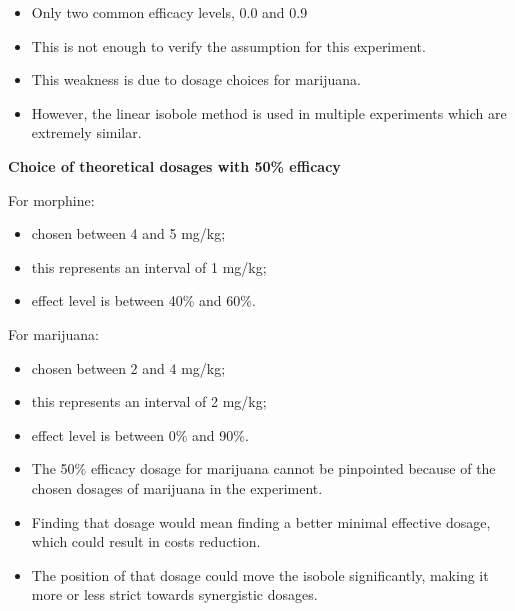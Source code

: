 \documentclass[14pt]{beamer}
\begin{document}
\begin{frame}
\begin{itemize}[label={$\blacktriangleright$}]
\item Only two common efficacy levels, 0.0 and 0.9
\item This is not enough to verify the assumption for this experiment.
\item This weakness is due to dosage choices for marijuana.
\item However, the linear isobole method is used in multiple experiments which are extremely similar.
\end{itemize}
\end{frame}

\begin{frame}
\textbf{Choice of theoretical dosages with 50\% efficacy}

For morphine:
\begin{itemize}[label={$\blacktriangleright$}]
\item chosen between 4 and 5 mg/kg;
\item this represents an interval of 1 mg/kg;
\item effect level is between 40\% and 60\%.
\end{itemize}
For marijuana:
\begin{itemize}[label={$\blacktriangleright$}]
\item chosen between 2 and 4 mg/kg;
\item this represents an interval of 2 mg/kg;
\item effect level is between 0\% and 90\%.
\end{itemize}
\end{frame}

\begin{frame}
\begin{itemize}[label={$\blacktriangleright$}]
\item The 50\% efficacy dosage for marijuana cannot be pinpointed because of the chosen dosages of marijuana in the experiment.
\item Finding that dosage would mean finding a better minimal effective dosage, which could result in costs reduction.
\item The position of that dosage could move the isobole significantly, making it more or less strict towards synergistic dosages.
\end{itemize}
\end{frame}
\end{document}
